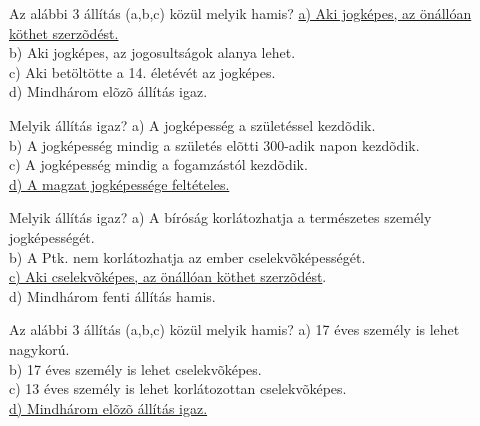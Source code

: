 \begin{frame}  

\begin{tcolorbox}[title={40. Kérdés}]
Az alábbi 3 állítás (a,b,c) közül melyik hamis?
\tcblower
\uline {a) Aki jogképes, az önállóan köthet szerzõdést.}\\
b) Aki jogképes, az jogosultságok alanya lehet.\\
c) Aki betöltötte a 14. életévét az jogképes.\\
d) Mindhárom elõzõ állítás igaz.
\end{tcolorbox}

\begin{tcolorbox}[title={41. Kérdés}]
Melyik állítás igaz?
\tcblower
a) A jogképesség a születéssel kezdõdik.\\
b) A jogképesség mindig a születés elõtti 300-adik napon kezdõdik.\\
c) A jogképesség mindig a fogamzástól kezdõdik.\\
\uline {d) A magzat jogképessége feltételes.}
\end{tcolorbox}

\begin{tcolorbox}[title={42. Kérdés}]
Melyik állítás igaz?
a) A bíróság korlátozhatja a természetes személy jogképességét.\\
b) A Ptk. nem korlátozhatja az ember cselekvõképességét.\\
\uline {c) Aki cselekvõképes, az önállóan köthet szerzõdést}.\\
d) Mindhárom fenti állítás hamis.
\end{tcolorbox}

\begin{tcolorbox}[title={43. Kérdés}]
Az alábbi 3 állítás (a,b,c) közül melyik hamis?
\tcblower
a) 17 éves személy is lehet nagykorú.\\
b) 17 éves személy is lehet cselekvõképes.\\
c) 13 éves személy is lehet korlátozottan cselekvõképes.\\
\uline {d) Mindhárom elõzõ állítás igaz.}
\end{tcolorbox}

\end{frame}


